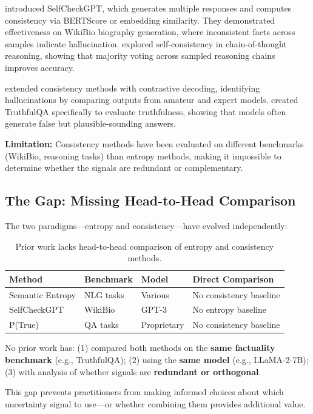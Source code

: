 \citet{manakul2023selfcheckgpt} introduced SelfCheckGPT, which generates multiple responses and computes consistency via BERTScore or embedding similarity. They demonstrated effectiveness on WikiBio biography generation, where inconsistent facts across samples indicate hallucination. \citet{wang2023selfconsistency} explored self-consistency in chain-of-thought reasoning, showing that majority voting across sampled reasoning chains improves accuracy.

\citet{chen2024contrastive} extended consistency methods with contrastive decoding, identifying hallucinations by comparing outputs from amateur and expert models. \citet{lin2022truthfulqa} created TruthfulQA specifically to evaluate truthfulness, showing that models often generate false but plausible-sounding answers.

\textbf{Limitation:} Consistency methods have been evaluated on different benchmarks (WikiBio, reasoning tasks) than entropy methods, making it impossible to determine whether the signals are redundant or complementary.

\subsection{The Gap: Missing Head-to-Head Comparison}

The two paradigms---entropy and consistency---have evolved independently:

\begin{table}[h]
\centering
\begin{tabular}{@{}llll@{}}
\toprule
Method & Benchmark & Model & Direct Comparison \\
\midrule
Semantic Entropy & NLG tasks & Various & No consistency baseline \\
SelfCheckGPT & WikiBio & GPT-3 & No entropy baseline \\
P(True) & QA tasks & Proprietary & No consistency baseline \\
\bottomrule
\end{tabular}
\caption{Prior work lacks head-to-head comparison of entropy and consistency methods.}
\label{tab:prior_work}
\end{table}

No prior work has: (1) compared both methods on the \textbf{same factuality benchmark} (e.g., TruthfulQA); (2) using the \textbf{same model} (e.g., LLaMA-2-7B); (3) with analysis of whether signals are \textbf{redundant or orthogonal}.

This gap prevents practitioners from making informed choices about which uncertainty signal to use---or whether combining them provides additional value.

